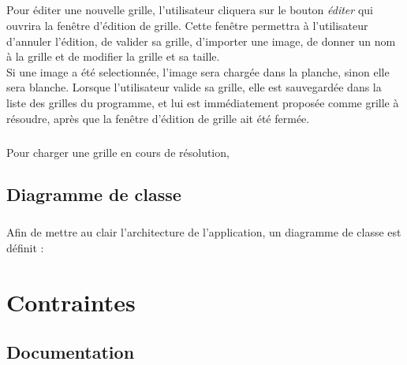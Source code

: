 \paragraph*{}
Pour éditer une nouvelle grille, l'utilisateur cliquera sur le bouton \textit{éditer} qui ouvrira la fenêtre d'édition de grille.
Cette fenêtre permettra à l'utilisateur d'annuler l'édition, de valider sa grille, d'importer une image, de donner un nom à la grille et de modifier la grille et sa taille.\\
Si une image a été selectionnée, l'image sera chargée dans la planche, sinon elle sera blanche.
Lorsque l'utilisateur valide sa grille, elle est sauvegardée dans la liste des grilles du programme, et lui est immédiatement proposée comme grille à résoudre, après que la fenêtre d'édition de grille ait été fermée.\\
\paragraph*{}
Pour charger une grille en cours de résolution, 
\paragraph*{} %
\paragraph*{}


\section{Diagramme de classe}
\paragraph*{}
Afin de mettre au clair l'architecture de l'application, un diagramme de classe est définit : 


\chapter{Contraintes}


\section{Documentation}
